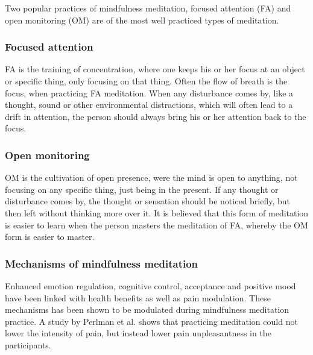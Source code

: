 


Two popular practices of mindfulness meditation, focused attention (FA) and open monitoring (OM) are of the most well practiced types of meditation. \cite{Zeidan2016}

\subsubsection{Focused attention} 
FA is the training of concentration, where one keeps his or her focus at an object or specific thing, only focusing on that thing. Often the flow of breath is the focus, when practicing FA meditation.  When any disturbance comes by, like a thought, sound or other environmental distractions, which will often lead to a drift in attention, the person should always bring his or her attention back to the focus. \cite{Zeidan2016}


\subsubsection{Open monitoring}
OM is the cultivation of open presence, were the mind is open to anything, not focusing on any specific thing, just being in the present. If any thought or disturbance comes by, the thought or sensation should be noticed briefly, but then left without thinking more over it. It is believed that this form of meditation is easier to learn when the person masters the meditation of FA, whereby the OM form is easier to master. \cite{Zeidan2016}



\subsubsection{Mechanisms of mindfulness meditation}
Enhanced emotion regulation, cognitive control, acceptance and positive mood have been linked with health benefits as well as pain modulation. These mechanisms has been shown to be modulated during mindfulness meditation practice.
A study by Perlman et al. \cite{Perlman2010} shows that practicing meditation could not lower the intensity of pain, but instead lower pain unpleasantness in the participants. \cite{Zeidan2012, Perlman2010}

